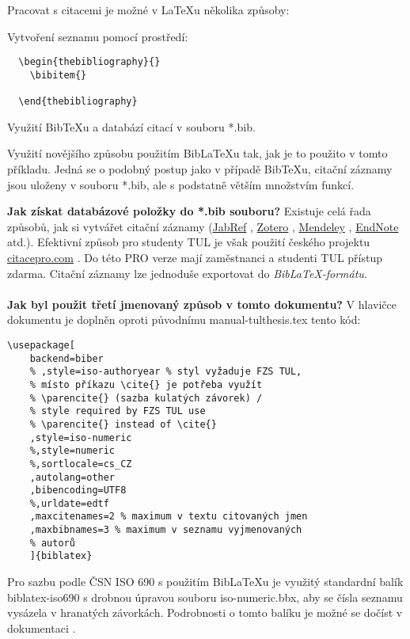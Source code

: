 \documentclass[FM,SP]{tulthesis}
\newcommand{\argument}[1]{{\ttfamily\color{\tulcolor}#1}}
\newenvironment{myquote}{\begin{list}{}{\setlength\leftmargin\parindent}\item[]}{\end{list}}
\newenvironment{listing}{\begin{myquote}\color{\tulcolor}}{\end{myquote}}
\begin{document}
Pracovat s citacemi je možné v \LaTeX{}u několika způsoby: 
\begin{enumerate}
  \item Vytvoření seznamu pomocí prostředí: 
  \begin{listing}
  \begin{verbatim}
  \begin{thebibliography}{}
    \bibitem{}
   
  \end{thebibliography}
  \end{verbatim}
  \end{listing}
  \item Využití Bib\TeX{}u a databází citací v souboru \argument{*.bib}.
  \item Využití novějšího způsobu použitím Bib\LaTeX{}u tak, jak je to použito v tomto příkladu. Jedná se o podobný postup jako v případě Bib\TeX{}u, citační záznamy jsou uloženy v souboru \argument{*.bib}, ale s podstatně větším množstvím funkcí. 
\end{enumerate}

\textbf{Jak získat databázové položky do \argument{*.bib} souboru?} Existuje celá řada způsobů, jak si vytvářet citační záznamy (\href{www.jabref.org}{JabRef} \cite{webJabRef}, \href{https://www.zotero.org}{Zotero} \cite{webZotero}, \href{https://www.mendeley.com}{Mendeley} \cite{webMendeley}, \href{https://endnote.com}{EndNote} \cite{webEndNote} atd.). Efektivní způsob pro studenty TUL je však použití českého projektu \href{citacepro.com}{citacepro.com} \cite{webCitaceCOM}. Do této PRO verze mají zaměstnanci a studenti TUL přístup zdarma. Citační záznamy lze jednoduše exportovat do \emph{Bib\LaTeX-formátu}. 

\paragraph{}
\textbf{Jak byl použit třetí jmenovaný způsob v tomto dokumentu?}
V hlavičce dokumentu je doplněn oproti původnímu \argument{manual-tulthesis.tex} tento kód:
\begin{listing}
\begin{verbatim}
\usepackage[ 
    backend=biber
    % ,style=iso-authoryear % styl vyžaduje FZS TUL, 
    % místo příkazu \cite{} je potřeba využít 
    % \parencite{} (sazba kulatých závorek) / 
    % style required by FZS TUL use 
    % \parencite{} instead of \cite{}
    ,style=iso-numeric
    %,style=numeric
    %,sortlocale=cs_CZ
    ,autolang=other
    ,bibencoding=UTF8
    %,urldate=edtf
    ,maxcitenames=2 % maximum v textu citovaných jmen
    ,maxbibnames=3 % maximum v seznamu vyjmenovaných 
    % autorů
    ]{biblatex}

\end{verbatim}
\end{listing}
Pro sazbu podle ČSN ISO 690 s použitím Bib\LaTeX{}u je využitý standardní balík \argument{biblatex-iso690} s drobnou úpravou souboru \argument{iso-numeric.bbx}, aby se čísla seznamu vysázela v hranatých závorkách. Podrobnosti o tomto balíku je možné se dočíst v dokumentaci \cite{webBiblatex-ISO690}.
\end{document}
